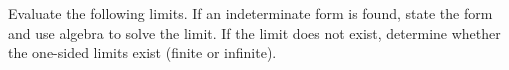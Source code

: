 \documentclass{siproblemset}
\begin{document}
    \pagebreak
    \begin{multipartquestion}
        Evaluate the following limits. If an indeterminate form is found, state the form and use algebra to solve the limit. If the limit does not exist, determine whether the one-sided limits exist (finite or infinite).
        \smallspace
        \smallspace
        \smallspace
    \end{multipartquestion}
    
\end{document}
